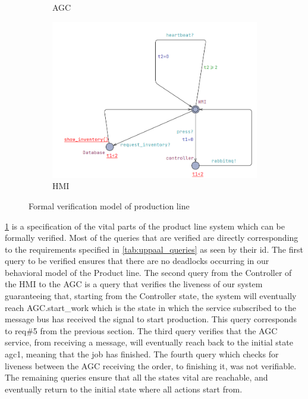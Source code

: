 \begin{figure}[h]
\begin{subfigure}[b]{0.5\linewidth}
    \caption{AGC}
  \end{subfigure}
  \begin{subfigure}[b]{0.7\linewidth}
    \includegraphics[width=\linewidth]{images/HMI.png}
    \caption{HMI}
  \end{subfigure}
  \caption{Formal verification model of production line}
  \label{fig:Productline}
\end{figure}




\ref{fig:Productline} is a specification of the vital parts of the product line system which can be formally verified. Most of the queries that are verified are directly corresponding to the requirements specified in \ref{tab:uppaal_queries} as seen by their id. The first query to be verified ensures that there are no deadlocks occurring in our behavioral model of the Product line. The second query from the Controller of the HMI to the AGC is a query that verifies the liveness of our system guaranteeing that, starting from the Controller state, the system will eventually reach AGC.start\_work which is the state in which the service subscribed to the message bus has received the signal to start production. This query corresponds to req\#5 from the previous section. The third query verifies that the AGC service, from receiving a message, will eventually reach back to the initial state agc1, meaning that the job has finished. The fourth query which checks for liveness between the AGC receiving the order, to finishing it, was not verifiable. The remaining queries ensure that all the states vital are reachable, and eventually return to the initial state where all actions start from. 


